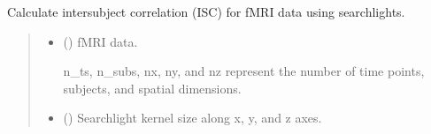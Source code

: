 \documentclass[letterpaper,10pt,english]{sphinxhowto}
\begin{document}

\begin{fulllineitems}
\label{\detokenize{isc_cal:neurora.isc_cal.isc_fmri}}
\pysigstartsignatures
{}
\pysigstopsignatures
\sphinxAtStartPar
Calculate inter\sphinxhyphen{}subject correlation (ISC) for fMRI data using searchlights.
\begin{quote}\begin{description}
\begin{itemize}
\item {} 
\sphinxAtStartPar
{} (\sphinxstyleliteralemphasis{\sphinxupquote{, }}\sphinxstyleliteralemphasis{\sphinxupquote{ {[}}}\sphinxstyleliteralemphasis{\sphinxupquote{, }}\sphinxstyleliteralemphasis{\sphinxupquote{, }}\sphinxstyleliteralemphasis{\sphinxupquote{, }}\sphinxstyleliteralemphasis{\sphinxupquote{, }}\sphinxstyleliteralemphasis{\sphinxupquote{{]}}}) \textendash{} 
\sphinxAtStartPar
fMRI data.

\sphinxAtStartPar
n\_ts, n\_subs, nx, ny, and nz represent the number of time points,
subjects, and spatial dimensions.


\item {} 
\sphinxAtStartPar
{} (\sphinxstyleliteralemphasis{\sphinxupquote{, }}\sphinxstyleliteralemphasis{\sphinxupquote{(}}\sphinxstyleliteralemphasis{\sphinxupquote{, }}\sphinxstyleliteralemphasis{\sphinxupquote{, }}\sphinxstyleliteralemphasis{\sphinxupquote{)}}) \textendash{} Searchlight kernel size along x, y, and z axes.


\end{itemize}
\end{description}
\end{quote}
\end{fulllineitems}
\end{document}
